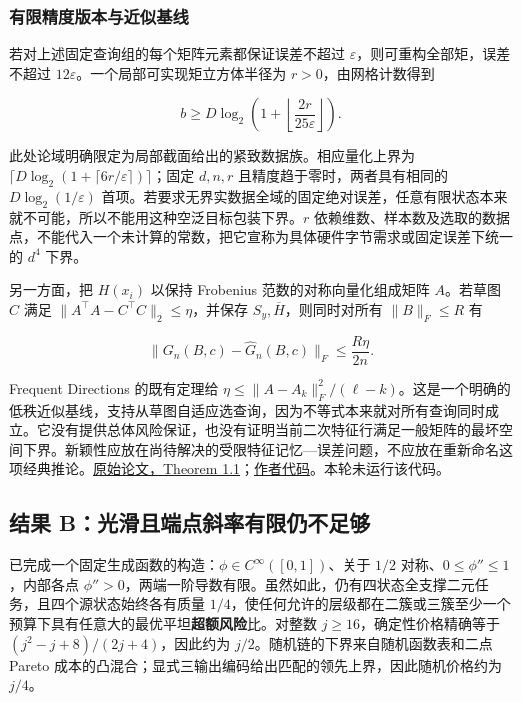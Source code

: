 \documentclass[11pt]{article}
\begin{document}
\subsubsection{有限精度版本与近似基线}\label{ux6709ux9650ux7cbeux5ea6ux7248ux672cux4e0eux8fd1ux4f3cux57faux7ebf}

若对上述固定查询组的每个矩阵元素都保证误差不超过 \(\varepsilon\)，则可重构全部矩，误差不超过 \(12\varepsilon\)。一个局部可实现矩立方体半径为 \(r>0\)，由网格计数得到

\[b\ge D\log_2\left(1+\left\lfloor\frac{2r}{25\varepsilon}\right\rfloor\right).\]

此处论域明确限定为局部截面给出的紧致数据族。相应量化上界为 \(\lceil D\log_2(1+\lceil6r/\varepsilon\rceil)\rceil\)；固定 \(d,n,r\) 且精度趋于零时，两者具有相同的 \(D\log_2(1/\varepsilon)\) 首项。若要求无界实数据全域的固定绝对误差，任意有限状态本来就不可能，所以不能用这种空泛目标包装下界。\(r\) 依赖维数、样本数及选取的数据点，不能代入一个未计算的常数，把它宣称为具体硬件字节需求或固定误差下统一的 \(d^4\) 下界。

另一方面，把 \(H(x_i)\) 以保持 Frobenius 范数的对称向量化组成矩阵 \(A\)。若草图 \(C\) 满足 \(\|A^\top A-C^\top C\|_2\le\eta\)，并保存 \(S_y,\overline H\)，则同时对所有 \(\|B\|_F\le R\) 有

\[\|G_n(B,c)-\widehat G_n(B,c)\|_F\le\frac{R\eta}{2n}.\]

Frequent Directions 的既有定理给 \(\eta\le\|A-A_k\|_F^2/(\ell-k)\)。这是一个明确的低秩近似基线，支持从草图自适应选查询，因为不等式本来就对所有查询同时成立。它没有提供总体风险保证，也没有证明当前二次特征行满足一般矩阵的最坏空间下界。新颖性应放在尚待解决的受限特征记忆---误差问题，不应放在重新命名这项经典推论。\href{https://arxiv.org/pdf/1501.01711}{原始论文，Theorem 1.1}；\href{https://github.com/edoliberty/frequent-directions}{作者代码}。本轮未运行该代码。

\subsection{结果 B：光滑且端点斜率有限仍不足够}\label{ux7ed3ux679c-bux5149ux6ed1ux4e14ux7aefux70b9ux659cux7387ux6709ux9650ux4ecdux4e0dux8db3ux591f}

已完成一个固定生成函数的构造：\(\phi\in C^\infty([0,1])\)、关于 \(1/2\) 对称、\(0\le\phi''\le1\)，内部各点 \(\phi''>0\)，两端一阶导数有限。虽然如此，仍有四状态全支撑二元任务，且四个源状态始终各有质量 \(1/4\)，使任何允许的层级都在二簇或三簇至少一个预算下具有任意大的最优平坦\textbf{超额风险}比。对整数 \(j\ge16\)，确定性价格精确等于 \((j^2-j+8)/(2j+4)\)，因此约为 \(j/2\)。随机链的下界来自随机函数表和二点 Pareto 成本的凸混合；显式三输出编码给出匹配的领先上界，因此随机价格约为 \(j/4\)。
\end{document}

